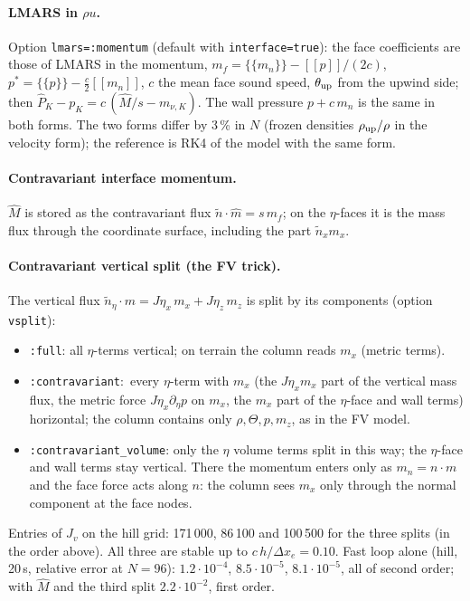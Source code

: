 \documentclass[11pt,a4paper]{article}
\newcommand{\avg}[1]{\{\!\{#1\}\!\}}
\newcommand{\jump}[1]{[\![#1]\!]}
\newcommand{\code}[1]{\texttt{#1}}
\begin{document}
\paragraph{LMARS in $\rho u$.} Option \code{lmars=:momentum} (default with \code{interface=true}): the face coefficients are those of LMARS in the
momentum, $m_f=\avg{m_n}-\jump p/(2c)$, $p^*=\avg p-\tfrac c2\jump{m_n}$, $c$ the mean face sound speed, $\theta_{\rm up}$ from the upwind side; then
$\hat P_K-p_K=c\,(\hat M/s-m_{\nu,K})$. The wall pressure $p+c\,m_n$ is the same in both forms. The two forms differ by 3\,\% in $N$ (frozen
densities $\rho_{\rm up}/\rho$ in the velocity form); the reference is RK4 of the model with the same form.

\paragraph{Contravariant interface momentum.} $\hat M$ is stored as the contravariant flux $\tilde n\cdot\hat m=s\,m_f$; on the $\eta$-faces it is the
mass flux through the coordinate surface, including the part $\tilde n_x m_x$.

\paragraph{Contravariant vertical split (the FV trick).} The vertical flux $\tilde n_\eta\cdot m=J\eta_x\,m_x+J\eta_z\,m_z$ is split by its components
(option \code{vsplit}):
\begin{itemize}
\item \code{:full}: all $\eta$-terms vertical; on terrain the column reads $m_x$ (metric terms).
\item \code{:contravariant}:\ every $\eta$-term with $m_x$ (the $J\eta_x m_x$ part of the vertical mass flux, the metric force $J\eta_x\partial_\eta p$ on $m_x$,
  the $m_x$ part of the $\eta$-face and wall terms) horizontal; the column contains only $\rho,\Theta,p,m_z$, as in the FV model.
\item \code{:contravariant\_volume}: only the $\eta$ volume terms split in this way; the $\eta$-face and wall terms stay vertical. There the momentum
  enters only as $m_n=n\cdot m$ and the face force acts along $n$: the column sees $m_x$ only through the normal component at the face nodes.
\end{itemize}
Entries of $J_v$ on the hill grid: 171\,000, 86\,100 and 100\,500 for the three splits (in the order above). All three are stable up to
$c\,h/\Delta x_e=0.10$. Fast loop alone (hill, 20\,s, relative error at $N=96$): $1.2\cdot10^{-4}$, $8.5\cdot10^{-5}$, $8.1\cdot10^{-5}$, all of second order;
with $\hat M$ and the third split $2.2\cdot10^{-2}$, first order.
\end{document}
